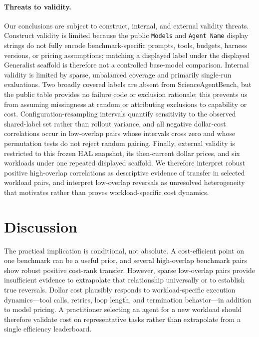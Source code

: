 \documentclass{article}
\begin{document}
\paragraph{Threats to validity.} Our conclusions are subject to construct, internal, and external validity threats. Construct validity is limited because the public \texttt{Models} and \texttt{Agent Name} display strings do not fully encode benchmark-specific prompts, tools, budgets, harness versions, or pricing assumptions; matching a displayed label under the displayed Generalist scaffold is therefore not a controlled base-model comparison. Internal validity is limited by sparse, unbalanced coverage and primarily single-run evaluations. Two broadly covered labels are absent from ScienceAgentBench, but the public table provides no failure code or exclusion rationale; this prevents us from assuming missingness at random or attributing exclusions to capability or cost. Configuration-resampling intervals quantify sensitivity to the observed shared-label set rather than rollout variance, and all negative dollar-cost correlations occur in low-overlap pairs whose intervals cross zero and whose permutation tests do not reject random pairing. Finally, external validity is restricted to this frozen HAL snapshot, its then-current dollar prices, and six workloads under one repeated displayed scaffold. We therefore interpret robust positive high-overlap correlations as descriptive evidence of transfer in selected workload pairs, and interpret low-overlap reversals as unresolved heterogeneity that motivates rather than proves workload-specific cost dynamics.

\section{Discussion}

The practical implication is conditional, not absolute. A cost-efficient point on one benchmark can be a useful prior, and several high-overlap benchmark pairs show robust positive cost-rank transfer. However, sparse low-overlap pairs provide insufficient evidence to extrapolate that relationship universally or to establish true reversals. Dollar cost plausibly responds to workload-specific execution dynamics---tool calls, retries, loop length, and termination behavior---in addition to model pricing. A practitioner selecting an agent for a new workload should therefore validate cost on representative tasks rather than extrapolate from a single efficiency leaderboard.
\end{document}
